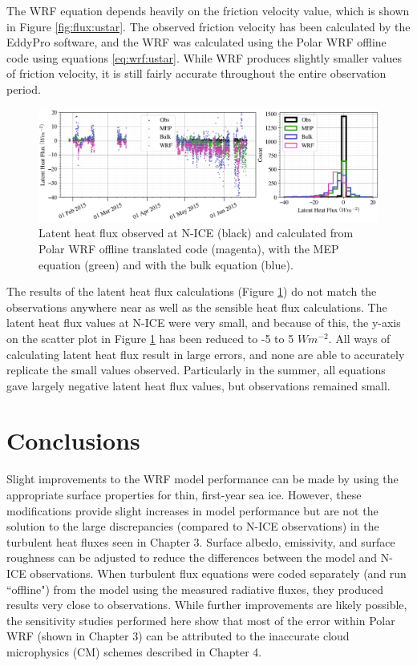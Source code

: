 The WRF equation depends heavily on the friction velocity value, which is shown in Figure \ref{fig:flux:ustar}. The observed friction velocity has been calculated by the EddyPro software, and the WRF was calculated using the Polar WRF offline code using equations \ref{eq:wrf:ustar}. While WRF produces slightly smaller values of friction velocity, it is still fairly accurate throughout the entire observation period. 

\begin{figure}[t]
    \centering
    \includegraphics[width=1\linewidth]{figures/chapter6/lhf_wrf_histo.png}
    \caption[Latent heat flux observed at N-ICE and calculated from Polar WRF offline translated code.]{Latent heat flux observed at N-ICE (black) and calculated from Polar WRF offline translated code (magenta), with the MEP equation (green) and with the bulk equation (blue).}
    \label{fig:flux:latent}
\end{figure}

The results of the latent heat flux calculations (Figure \ref{fig:flux:latent}) do not match the observations anywhere near as well as the sensible heat flux calculations. The latent heat flux values at N-ICE were very small, and because of this, the y-axis on the scatter plot in Figure \ref{fig:flux:latent} has been reduced to -5 to 5 $Wm^{-2}$. All ways of calculating latent heat flux result in large errors, and none are able to accurately replicate the small values observed. Particularly in the summer, all equations gave largely negative latent heat flux values, but observations remained small.

\section{Conclusions}
Slight improvements to the WRF model performance can be made by using the appropriate surface properties for thin, first-year sea ice. However, these modifications provide slight increases in model performance but are not the solution to the large discrepancies (compared to N-ICE observations) in the turbulent heat fluxes seen in Chapter 3. Surface albedo, emissivity, and surface roughness can be adjusted to reduce the differences between the model and N-ICE observations. When turbulent flux equations were coded separately (and run ``offline") from the model using the measured radiative fluxes, they produced results very close to observations. While further improvements are likely possible, the sensitivity studies performed here show that most of the error within Polar WRF (shown in Chapter 3) can be attributed to the inaccurate cloud microphysics (CM) schemes described in Chapter 4. 

